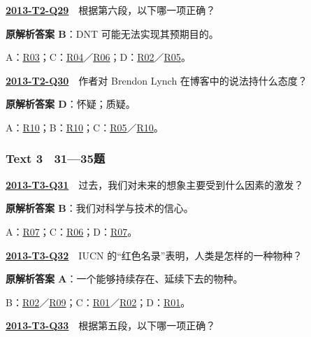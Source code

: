 \documentclass[11pt,a4paper]{article}
\begin{document}
\label{idx-2013-T2-Q29}\noindent\textbf{\href{https://zj139.github.io/math-notes/english/24e1f1efe1e982cf789b6917/\#q29}{2013-T2-Q29}}　根据第六段，以下哪一项正确？\par\nopagebreak
\noindent\textbf{原解析答案 B}：DNT 可能无法实现其预期目的。\par\nopagebreak
\noindent A：\hyperref[cat-R03]{R03}；C：\hyperref[cat-R04]{R04}／\hyperref[cat-R06]{R06}；D：\hyperref[cat-R02]{R02}／\hyperref[cat-R05]{R05}。\par\smallskip
{}\label{idx-2013-T2-Q30}\noindent\textbf{\href{https://zj139.github.io/math-notes/english/24e1f1efe1e982cf789b6917/\#q30}{2013-T2-Q30}}　作者对 Brendon Lynch 在博客中的说法持什么态度？\par\nopagebreak
\noindent\textbf{原解析答案 D}：怀疑；质疑。\par\nopagebreak
\noindent A：\hyperref[cat-R10]{R10}；B：\hyperref[cat-R10]{R10}；C：\hyperref[cat-R05]{R05}／\hyperref[cat-R10]{R10}。\par\smallskip
\clearpage
{}\subsubsection{Text 3　31—35题}
\label{idx-2013-T3-Q31}\noindent\textbf{\href{https://zj139.github.io/math-notes/english/2d46a333fce8ad67ea684c5b/\#q31}{2013-T3-Q31}}　过去，我们对未来的想象主要受到什么因素的激发？\par\nopagebreak
\noindent\textbf{原解析答案 B}：我们对科学与技术的信心。\par\nopagebreak
\noindent A：\hyperref[cat-R07]{R07}；C：\hyperref[cat-R06]{R06}；D：\hyperref[cat-R07]{R07}。\par\smallskip
{}\label{idx-2013-T3-Q32}\noindent\textbf{\href{https://zj139.github.io/math-notes/english/2d46a333fce8ad67ea684c5b/\#q32}{2013-T3-Q32}}　IUCN 的“红色名录”表明，人类是怎样的一种物种？\par\nopagebreak
\noindent\textbf{原解析答案 A}：一个能够持续存在、延续下去的物种。\par\nopagebreak
\noindent B：\hyperref[cat-R02]{R02}／\hyperref[cat-R09]{R09}；C：\hyperref[cat-R01]{R01}／\hyperref[cat-R02]{R02}；D：\hyperref[cat-R01]{R01}。\par\smallskip
{}\label{idx-2013-T3-Q33}\noindent\textbf{\href{https://zj139.github.io/math-notes/english/2d46a333fce8ad67ea684c5b/\#q33}{2013-T3-Q33}}　根据第五段，以下哪一项正确？\par\nopagebreak
\end{document}

